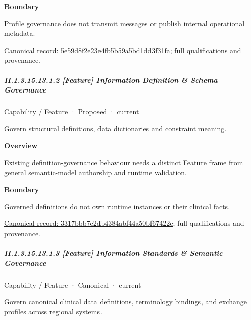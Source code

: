 \textbf{Boundary}



Profile governance does not transmit messages or publish internal operational metadata.


{\footnotesize \href{../../../../continuum/strategy/capability/feature/5e59d8f2e23e4fb5b59a5bd1dd3f31fa.md}{Canonical record: 5e59d8f2e23e4fb5b59a5bd1dd3f31fa}; full qualifications and provenance.}\par
\subparagraph*{II.1.3.15.13.1.2 [Feature] Information Definition \& Schema Governance}
\label{navigation:II.1.3.15.13.1.2}

\label{element:3317bbb7e2db4384abf44a50bf67422c}
{\small Capability / Feature · Proposed · current}\par

Govern structural definitions, data dictionaries and constraint meaning.



\textbf{Overview}



Existing definition-governance behaviour needs a distinct Feature frame from general semantic-model authorship and runtime validation.



\textbf{Boundary}



Governed definitions do not own runtime instances or their clinical facts.


{\footnotesize \href{../../../../continuum/strategy/capability/feature/3317bbb7e2db4384abf44a50bf67422c.md}{Canonical record: 3317bbb7e2db4384abf44a50bf67422c}; full qualifications and provenance.}\par
\subparagraph*{II.1.3.15.13.1.3 [Feature] Information Standards \& Semantic Governance}
\label{navigation:II.1.3.15.13.1.3}

\label{element:af5d5249302f47ebb393c91afcc60392}
{\small Capability / Feature · Canonical · current}\par

Govern canonical clinical data definitions, terminology bindings, and exchange profiles across regional systems.



